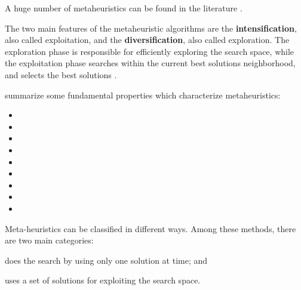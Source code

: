 A huge number of metaheuristics can be found in the literature \cite{du2016search, FisterYFBF13, sorensen2017history}.

The two main features of the metaheuristic algorithms are the \textbf{intensification}, also called exploitation, and the \textbf{diversification}, also called exploration. The exploration phase is responsible for efficiently exploring the search space, while the exploitation phase searches within the current best solutions neighborhood, and selects the best solutions \cite{blum2003metaheuristics,gandomi2013metaheuristic,Yang2014}.

 summarize some fundamental properties which characterize metaheuristics:

\begin{itemize}
\item {}
\item {}
\item {}
\item {}
\item {}
\item {}
\item {}
\item {}
\item {}
\end{itemize}

Meta-heuristics can be classified in different ways. Among these methods, there are two main categories:

\begin{description}[style=sameline]
    \item[Single-solution] does the search by using only one solution at time; and
    \item[Population-based] uses a set of solutions for exploiting the search space.
\end{description}

